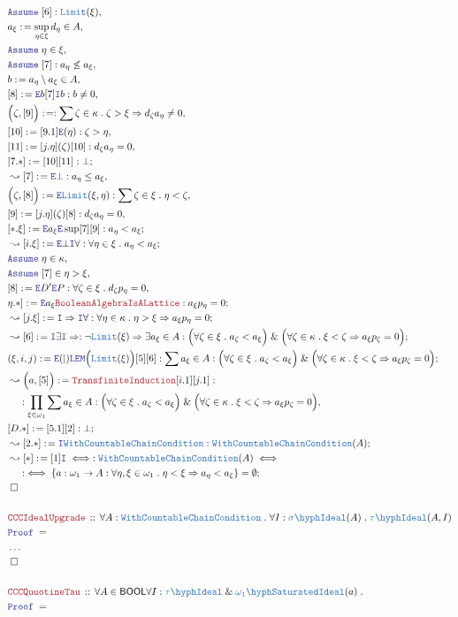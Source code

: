 \documentclass[12pt]{scrartcl}
\newcommand{\TYPE}[1]{\textcolor{NavyBlue}{\mathtt{#1}}}
\newcommand{\LOGIC}[1]{\textcolor{Blue}{\mathtt{#1}}}
\newcommand{\THM}[1]{\textcolor{Maroon}{\mathtt{#1}}}
\renewcommand{\.}{\; . \;}
\newcommand{\de}{: \kern 0.1pc =}
\newcommand{\Theorem}[2]{& \THM{#1} \, :: \, #2 \\ & \Proof = \\ }
\newcommand{\NewLine}{\\ & \kern 1pc}
\newcommand{\Page}[1]{ \begin{align*} #1 \end{align*}   }
\newcommand{\NoProof}{ & \ldots \\ \EndProof}
\renewcommand{\And}{\; \& \;}
\newcommand{\Imply}{\Rightarrow}
\newcommand{\Intro}{\LOGIC{I}}
\newcommand{\Elim}{\LOGIC{E}}
\newcommand{\Say}[3]{& #1 \de #2 : #3, \\}
\newcommand{\SayIn}[3]{& #1 \de #2 \in #3, \\}
\newcommand{\Conclude}[3]{& #1 \de #2 : #3; \\}
\newcommand{\Derive}[3]{& \leadsto #1 \de #2 : #3, \\}
\newcommand{\DeriveConclude}[3]{& \leadsto #1 \de #2 : #3 ; \\}
\newcommand{\Assume}[2]{& \LOGIC{Assume} \; #1 : #2, \\}
\newcommand{\AssumeIn}[2]{& \LOGIC{Assume} \; #1 \in #2, \\}
\newcommand{\QED}{\; \square}
\newcommand{\EndProof}{& \QED \\}
\newcommand{\Proof}{\LOGIC{Proof} \; }
\newcommand{\Ideal}{\TYPE{Ideal}}
\newcommand{\SIdeal}{\TYPE{\sigma\hyph \Ideal}}
\newcommand{\Limit}{\TYPE{Limit}}
\newcommand{\CCC}{\TYPE{WithCountableChainCondition}}
\newcommand{\CSI}{\TYPE{\omega_1\hyph SaturatedIdeal}}
\newcommand{\BOOL}{\mathsf{BOOL}}
\begin{document}
\Page{
	\Assume{[6]}{\Limit(\xi)}
	\SayIn{a_\xi}{ \sup_{\eta \in \xi} d_\eta }{A}
	\AssumeIn{\eta}{\xi}
	\Assume{[7]}{a_\eta \not \le a_\xi}
	\SayIn{b}{a_\eta \setminus a_\xi}{A}
	\Say{[8]}{\Elim b [7] \Intro b}{b \neq 0}
	\Say{\Big( \zeta, [9]\Big)}{}
	{
		\sum \zeta \in \kappa \.
		\zeta > \xi \Imply d_\zeta a_\eta \neq 0 
	}
	\Say{[10]}{[9.1]\Elim(\eta)}{ \zeta > \eta }
	\Say{[11]}{[j.\eta](\zeta)[10]}{ d_\zeta a_\eta = 0 }
	\Conclude{[7.*]}{[10][11]}{\bot}
	\Derive{[7]}{\Elim \bot}{a_\eta \le a_\xi}
	\Say{\Big(\zeta,[8]\Big)}{\Elim \Limit(\xi,\eta)}
	{
		\sum \zeta \in \xi \. \eta < \zeta 
	}
	\Say{[9]}{[j.\eta](\zeta)[8]}{ d_\zeta a_\eta = 0}
	\Conclude{[*.\xi]}{\Elim a_\xi \Elim \sup [7][9]}{a_\eta < a_\xi}
	\DeriveConclude{[i.\xi]}{\Elim \bot \Intro \forall}
	{
		\forall \eta \in \xi \. a_\eta < a_\xi
	}
	\AssumeIn{\eta}{\kappa}
	\AssumeIn{[7]}{\eta > \xi }
	\Say{[8]}{\Elim D' \Elim P}
	{
		\forall \zeta \in \xi \.
		d_\zeta p_\eta = 0
	}
	\Conclude{\eta.*]}{\Elim a_\xi \THM{BooleanAlgebraIsALattice} }
	{
		a_\xi p_\eta = 0
	}
	\DeriveConclude{[j.\xi]}{\Intro \Imply \Intro \forall}
	{
		\forall \eta \in \kappa \.
		\eta > \xi
		\Imply
		a_\xi p_\eta = 0
	}
	\DeriveConclude{[6]}{\Intro \exists \Intro \Imply}
	{
		\neg \Limit(\xi) \Imply 
		\exists a_\xi \in A :
		\Big(  \forall \zeta \in \xi \. a_\zeta < a_\xi \Big)
		\And
		\Big(  
			\forall \zeta \in \kappa \.
			\xi < \zeta
			\Imply 
			a_\xi p_\zeta = 0 
		\Big)
	}
	\Conclude{(\xi,i,j)}{\Elim (|) \LOGIC{LEM}\Big(\Limit(\xi)\Big)[5][6]}
	{
		\sum a_\xi \in A :
		\Big(  \forall \zeta \in \xi \. a_\zeta < a_\xi \Big)
		\And
		\Big(  
			\forall \zeta \in \kappa \.
			\xi < \zeta
			\Imply 
			a_\xi p_\zeta = 0 
		\Big)
	}
	\Derive{\Big(a,[5]\Big)}{\THM{TransfiniteInduction}[i.1][j.1]}
	{
		\NewLine :		
		\prod_{\xi \in \omega_1}
		\sum a_\xi \in A :
		\Big(  \forall \zeta \in \xi \. a_\zeta < a_\xi \Big)
		\And
		\Big(  
			\forall \zeta \in \kappa \.
			\xi < \zeta
			\Imply 
			a_\xi p_\zeta = 0 
		\Big)
	}
	\Conclude{[D.*]}{[5.1][2]}{\bot}
	\DeriveConclude{[2.*]}{\Intro \CCC}{\CCC(A)}
	\DeriveConclude{[*]}{[1]\Intro \iff }
	{
		\CCC(A)
		\iff
		\NewLine :
		\iff
		\{ 
			a : \omega_1 \to A : 
			\forall \eta,\xi \in  \omega_1 \. 
			\eta < \xi \Imply
			a_\eta < a_\xi    
		\} = \emptyset
	}
	\EndProof
	\\
	\Theorem{CCCIdealUpgrade}
	{
		\forall A : \CCC \.
		\forall I : \SIdeal(A) \.
		\TYPE{\tau\hyph Ideal}(A,I)
	}
	\NoProof
	\\
	\Theorem{CCCQuuotineTau}
	{
		\forall A \in \BOOL
		\forall I : \TYPE{\tau\hyph Ideal} \And \CSI(a) \.
}}
\end{document}
